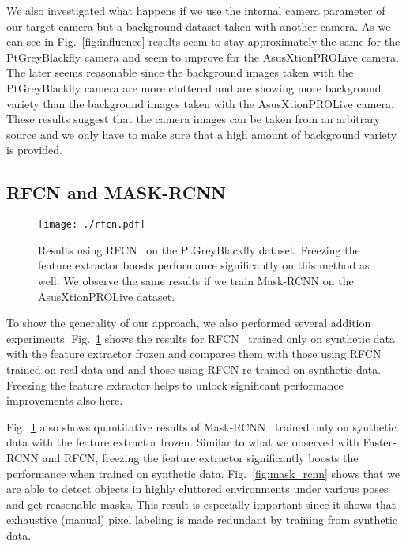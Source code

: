 \documentclass[10pt,twocolumn,letterpaper]{article}
\newcommand{\stefanrmk}[1]{{\color{DarkRed}\bf #1}}
\newcommand{\asus}[0]{AsusXtionPROLive\xspace}
\newcommand{\ptgrey}[0]{PtGreyBlackfly\xspace}
\begin{document}
We also investigated what happens if we use the internal camera parameter of our
target camera but a background dataset taken with another camera.  As we can see
in Fig.~\ref{fig:influence} results seem to  stay approximately the same for the
\ptgrey  camera and  seem  to improve  for  the \asus  camera.  The later  seems
reasonable since  the background images taken  with the \ptgrey camera  are more
cluttered and  are showing  more background variety  than the  background images
taken with the  \asus camera.  These results suggest that  the camera images can
be taken  from an arbitrary  source and we  only have to  make sure that  a high
amount of background variety is provided.



\subsection{RFCN and MASK-RCNN}
\label{sec:other_detectors}

\begin{figure}[ht]
\begin{center}
\texttt{[image: ./rfcn.pdf]}
\end{center}
\caption{\label{fig:rfcn}  Results   using  RFCN~\cite{rfcn}  on   the  \ptgrey
  dataset. Freezing  the feature  extractor boosts performance  significantly on
  this method as well.  We observe the same results if  we train Mask-RCNN on
    the \asus dataset.}
\end{figure}


To  show the  generality of  our approach,  we also  performed several  addition
experiments.  Fig.~\ref{fig:rfcn} shows the results for RFCN~\cite{rfcn} trained
only on  synthetic data with  the feature  extractor frozen and  compares them
with those  using RFCN  trained on  real data and  and those
using RFCN re-trained on synthetic data. Freezing the feature extractor helps to
unlock significant performance improvements also here.


Fig.~\ref{fig:rfcn} also shows quantitative  results of Mask-RCNN~\cite{mask_rcnn} trained only
on  synthetic data  with  the  feature extractor  frozen.   Similar  to what  we
observed with Faster-RCNN and RFCN, freezing the feature extractor significantly
boosts the performance when  trained on synthetic data. Fig.~\ref{fig:mask_rcnn}
shows that we are able to  detect objects in highly cluttered environments under
various poses  and get  reasonable masks.  This  result is  especially important
since it  shows that  exhaustive (manual)  pixel labeling  is made  redundant by
training from synthetic data.
\end{document}
